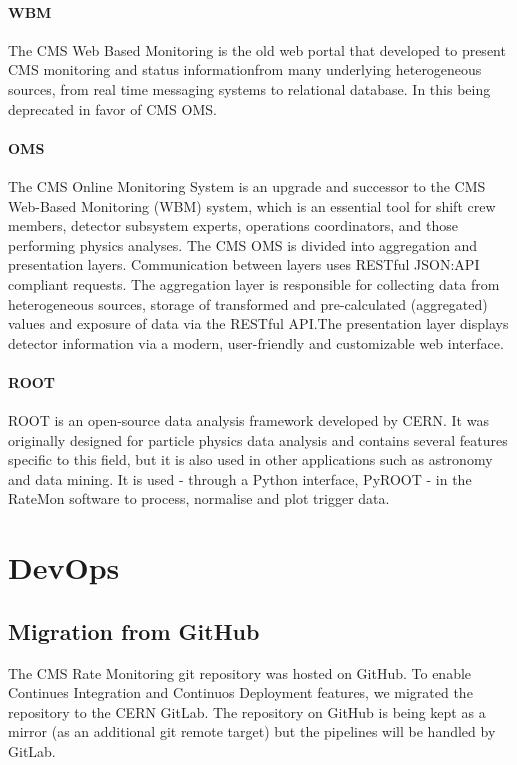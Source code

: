 \paragraph{WBM} The CMS Web Based Monitoring \cite{badgett2014web} is the old web portal that developed to present CMS monitoring and status informationfrom many underlying heterogeneous sources, from real time messaging systems to relational database. In this being deprecated in favor of CMS OMS.

\paragraph{OMS} The CMS Online Monitoring System \cite{Andre2649402} is an upgrade and successor to the CMS Web-Based Monitoring (WBM) system, which is an essential tool for shift crew members, detector subsystem experts, operations coordinators, and those performing physics analyses. The CMS OMS is divided into aggregation and presentation layers. Communication between layers uses RESTful JSON:API compliant requests. The aggregation layer is responsible for collecting data from heterogeneous sources, storage of transformed and pre-calculated (aggregated) values and exposure of data via the RESTful API.The presentation layer displays detector information via a modern, user-friendly and customizable web interface.

\paragraph{ROOT} ROOT \cite{Brun:1997pa} is an open-source data analysis framework developed by CERN. It was originally designed for particle physics data analysis and contains several features specific to this field, but it is also used in other applications such as astronomy and data mining. It is used - through a Python interface, PyROOT \cite{PythoninterfacePyROOTROOT-2020-10-02} - in the RateMon software to process, normalise and plot trigger data.


\section{DevOps}

\subsection{Migration from GitHub}

The CMS Rate Monitoring git repository was hosted on GitHub. To enable Continues Integration and Continuos Deployment features, we migrated the repository to the CERN GitLab. The repository on GitHub is being kept as a mirror (as an additional git remote target) but the pipelines will be handled by GitLab.


